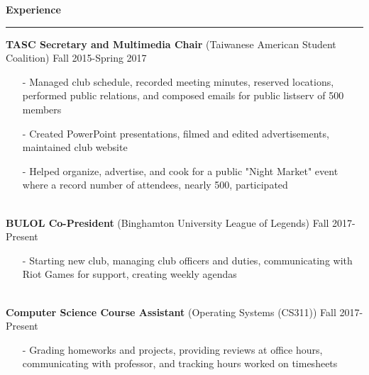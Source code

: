 \documentclass[11pt]{article}
\newcommand{\Hrule}{\vspace{1mm}\hrule\vspace{1mm}}
\begin{document}
    \noindent\large\textbf{Experience}
        \Hrule
        \indent\small{\textbf{TASC Secretary and Multimedia Chair} (Taiwanese American Student Coalition)} \hfill \small{Fall 2015-Spring 2017}\indent\vspace{0.5mm}
            \indent\begin{minipage}{\dimexpr\textwidth-6cm}
                \begin{itemize}[noitemsep, topsep=0pt]
                    \item[-] Managed club schedule, recorded meeting minutes, reserved locations, performed public relations, and composed emails for public listserv of 500 members
                    \item[-] Created PowerPoint presentations, filmed and edited advertisements, maintained club website
                    \item[-] Helped organize, advertise, and cook for a public "Night Market" event where a record number of attendees, nearly 500, participated
                \end{itemize}\vspace{0mm}
            \end{minipage}\\
        \indent\small{\textbf{BULOL Co-President} (Binghamton University League of Legends)} \hfill \small{Fall 2017-Present}\indent\vspace{0.5mm}\\
            \indent\begin{minipage}{\dimexpr\textwidth-6cm}
                \begin{itemize}[noitemsep, topsep=0pt]
                    \item[-] Starting new club, managing club officers and duties, communicating with Riot Games for support, creating weekly agendas
                \end{itemize}\vspace{0mm}
            \end{minipage}\\
        \indent\small{\textbf{Computer Science Course Assistant} (Operating Systems (CS311))} \hfill \small{Fall 2017-Present}\indent\vspace{0.5mm}\\
            \indent\begin{minipage}{\dimexpr\textwidth-6cm}
                \begin{itemize}[noitemsep, topsep=0pt]
                    \item[-] Grading homeworks and projects, providing reviews at office hours, communicating with professor, and tracking hours worked on timesheets
                \end{itemize}\vspace{0mm}
            \end{minipage}\\
\end{document}

